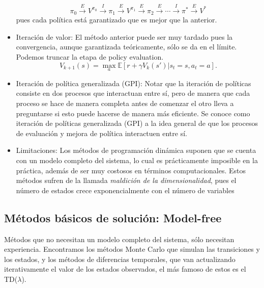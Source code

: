 \documentclass[11pt]{article}
\theoremstyle{plain}
\begin{document}
\begin{itemize}
					\[ \pi_0 \xrightarrow{E} V^{\pi_0} \xrightarrow{I} \pi_1 \xrightarrow{E} V^{\pi_1} \xrightarrow{E} \pi_2 \xrightarrow{E} \cdots \xrightarrow{I} \pi^\ast \xrightarrow{E} V^\ast  \]
					pues cada política está garantizado que es mejor que la anterior.
					\item Iteración de valor: El método anterior puede ser muy tardado pues la convergencia, aunque garantizada teóricamente, sólo se da en el límite. Podemos truncar la etapa de policy evaluation.
					\[ V_{k+1}(s) = \max_a \mathbb{E}[r + \gamma V_k(s')|s_t=s,a_t=a]. \]
					\item Iteración de política generalizada (GPI): Notar que la iteración de políticas consiste en dos procesos que interactuan entre sí, pero de manera que cada proceso se hace de manera completa antes de comenzar el otro lleva a preguntarse si esto puede hacerse de manera más eficiente. Se conoce como iteración de políticas generalizada (GPI) a la idea general de que los procesos de evaluación y mejora de política interactuen entre sí.
					\item Limitaciones: Los métodos de programación dinámica suponen que se cuenta con un modelo completo del sistema, lo cual es prácticamente imposible en la práctica, además de ser muy costosos en términos computacionales. Estos métodos sufren de la llamada \textit{maldición de la dimensionalidad}, pues el número de estados crece exponencialmente con el número de variables
				\end{itemize}
\subsection{Métodos básicos de solución: Model-free}
Métodos que no necesitan un modelo completo del sistema, sólo necesitan experiencia. Encontramos los métodos Monte Carlo que simulan las transiciones y los estados, y los métodos de diferencias temporales, que van actualizando iterativamente el valor de los estados observados, el más famoso de estos es el TD($\lambda$).
\end{document}
